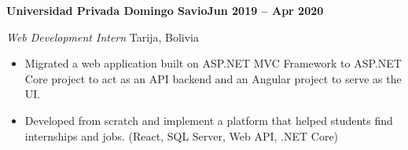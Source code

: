\textbf{Universidad Privada Domingo Savio\hfill  Jun 2019 -- Apr 2020} \par
\textit{Web Development Intern} \hfill Tarija, Bolivia\par
\begin{itemize}
	\item Migrated a web application built on ASP.NET MVC Framework to ASP.NET Core project to act as an API backend and an Angular project to serve as the UI.
	\item Developed from scratch and implement a platform that helped students find internships and jobs. (React, SQL Server, Web API, .NET Core)
\end{itemize} \par